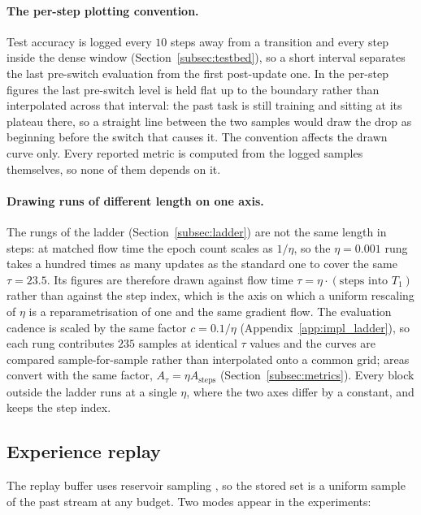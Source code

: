 \paragraph{The per-step plotting convention.}
\label{app:impl_plotting}
Test accuracy is logged every $10$ steps away from a transition and every step inside the dense window (Section~\ref{subsec:testbed}), so a short interval separates the last pre-switch evaluation from the first post-update one. In the per-step figures the last pre-switch level is held flat up to the boundary rather than interpolated across that interval: the past task is still training and sitting at its plateau there, so a straight line between the two samples would draw the drop as beginning before the switch that causes it. The convention affects the drawn curve only. Every reported metric is computed from the logged samples themselves, so none of them depends on it.

\paragraph{Drawing runs of different length on one axis.}
\label{app:impl_flowaxis}
The rungs of the ladder (Section~\ref{subsec:ladder}) are not the same length in steps: at matched flow time the epoch count scales as $1/\eta$, so the $\eta = 0.001$ rung takes a hundred times as many updates as the standard one to cover the same $\tau = 23.5$. Its figures are therefore drawn against flow time $\tau = \eta \cdot (\text{steps into } T_1)$ rather than against the step index, which is the axis on which a uniform rescaling of $\eta$ is a reparametrisation of one and the same gradient flow. The evaluation cadence is scaled by the same factor $c = 0.1/\eta$ (Appendix~\ref{app:impl_ladder}), so each rung contributes $235$ samples at identical $\tau$ values and the curves are compared sample-for-sample rather than interpolated onto a common grid; areas convert with the same factor, $A_\tau = \eta A_{\text{steps}}$ (Section~\ref{subsec:metrics}). Every block outside the ladder runs at a single $\eta$, where the two axes differ by a constant, and keeps the step index.

\subsection{Experience replay}
\label{app:impl_er}

The replay buffer uses reservoir sampling \citep{vitter1985random}, so the stored set is a uniform sample of the past stream at any budget. Two modes appear in the experiments:

